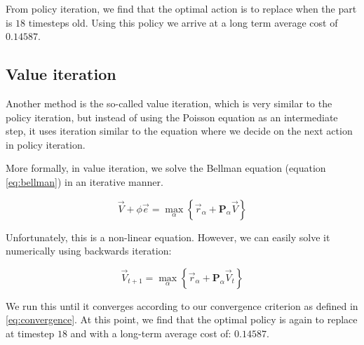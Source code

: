 \documentclass{uniarticle}
\begin{document}
From policy iteration, we find that the optimal action is to replace when the
part is $18$ timesteps old. Using this policy we arrive at a long term average cost of
$0.14587$.

\subsection{Value iteration}

Another method is the so-called value iteration, which is very similar to the
policy iteration, but instead of using the Poisson equation as an intermediate
step, it uses iteration similar to the equation where we decide on the next
action in policy iteration.

More formally, in value iteration, we solve the Bellman equation
(equation \ref{eq:bellman}) in an iterative
manner.

\begin{equation}\label{eq:bellman}
    \vec{V} + \phi \vec{e} = \max_\alpha \left\{ \vec{r}_\alpha + \mathbf{P}_\alpha \vec{V} \right\}
\end{equation}

Unfortunately, this is a non-linear equation. However, we can easily solve it
numerically using backwards iteration:

\begin{equation}\label{eq:value}
    \vec{V}_{t+1} = \max_\alpha \left\{ \vec{r}_\alpha + \mathbf{P}_\alpha \vec{V}_t \right\}
\end{equation}

We run this until it converges according to our convergence criterion as
defined in \cref{eq:convergence}. At this point, we find that the optimal policy
is again to replace at timestep $18$ and with a long-term average cost of: $0.14587$.

\balance



\end{document}

